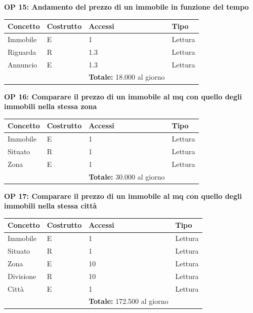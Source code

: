 \documentclass[a4paper,12pt]{report}
\begin{document}
             \textbf{OP 15: Andamento del prezzo di un immobile in funzione del tempo}
        	\begin{table}[H]
            \centering
             \begin{tabular}{llll}
             \rowcolor{yellow!20} \textbf{Concetto} & \textbf{Costrutto} & \textbf{Accessi} & \textbf{Tipo}\\ [0.5ex] 
             \hline
             Immobile & E & 1 & Lettura \\ 
             Riguarda & R & 1.3 & Lettura \\ 
             Annuncio & E & 1.3 & Lettura \\ 
             \hline
                \rowcolor{yellow!20} &   & \textbf{Totale:}  18.000 al giorno &  \\ [1ex] 
             
             \end{tabular}
            \end{table}

            \textbf{OP 16: Comparare il prezzo di un immobile al mq con quello degli immobili nella stessa zona}
        	\begin{table}[H]
            \centering
             \begin{tabular}{llll}
             \rowcolor{yellow!20} \textbf{Concetto} & \textbf{Costrutto} & \textbf{Accessi} & \textbf{Tipo}\\ [0.5ex] 
             \hline
             Immobile & E & 1 & Lettura \\ 
             Situato & R & 1 & Lettura \\ 
             Zona & E & 1 & Lettura \\ 
             \hline
                \rowcolor{yellow!20} &   & \textbf{Totale:}  30.000 al giorno &  \\ [1ex] 
             
             \end{tabular}
            \end{table}

            \textbf{OP 17: Comparare il prezzo di un immobile al mq con quello degli immobili nella stessa città}
        	\begin{table}[H]
            \centering
             \begin{tabular}{llll}
             \rowcolor{yellow!20} \textbf{Concetto} & \textbf{Costrutto} & \textbf{Accessi} & \textbf{Tipo}\\ [0.5ex] 
             \hline
             Immobile & E & 1 & Lettura \\ 
             Situato & R & 1 & Lettura \\ 
             Zona & E & 10 & Lettura \\ 
             Divisione & R & 10 & Lettura \\ 
             Città & E & 1 & Lettura \\ 
             \hline
                \rowcolor{yellow!20} &   & \textbf{Totale:}  172.500 al giorno &  \\ [1ex] 
             
             \end{tabular}
            \end{table}
\end{document}

